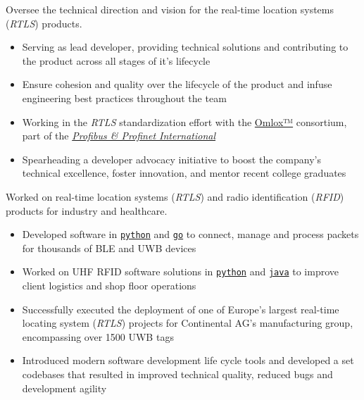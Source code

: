 \documentclass[10pt,a4paper,ragged2e,withhyper]{altacv}
\begin{document}
\begin{paracol}{2}


Oversee the technical direction and vision for the real-time location systems (\textit{RTLS}) products.

\medskip

\begin{itemize}
  \item Serving as lead developer, providing technical solutions and contributing to the product across all stages of it's lifecycle
  \item Ensure cohesion and quality over the lifecycle of the product and infuse engineering best practices throughout the team
  \item Working in the \textit{RTLS} standardization effort with the \href{https://omlox.com/}{Omlox™} consortium, part of the \href{https://www.profibus.com/technology/omlox}{\textit{Profibus \& Profinet International}}
  \item Spearheading a developer advocacy initiative to boost the company's technical excellence, foster innovation, and mentor recent college graduates
\end{itemize}

\divider

\medskip


Worked on real-time location systems (\textit{RTLS}) and radio identification (\textit{RFID}) products for industry and healthcare.

\medskip

\begin{itemize}
  \item Developed software in \texttt{\href{https://www.python.org/}{python}} and \texttt{\href{https://go.dev/}{go}} to connect, manage and process packets for thousands of BLE and UWB devices
  \item Worked on UHF RFID software solutions in \texttt{\href{https://www.python.org/}{python}} and \texttt{\href{https://www.java.com/en/}{java}} to improve client logistics and shop floor operations
  \item Successfully executed the deployment of one of Europe's largest real-time locating system (\textit{RTLS}) projects for Continental AG's manufacturing group, encompassing over 1500 UWB tags
  \item Introduced modern software development life cycle tools and developed a set codebases that resulted in improved technical quality, reduced bugs and development agility
\end{itemize}



\end{paracol}
\end{document}
